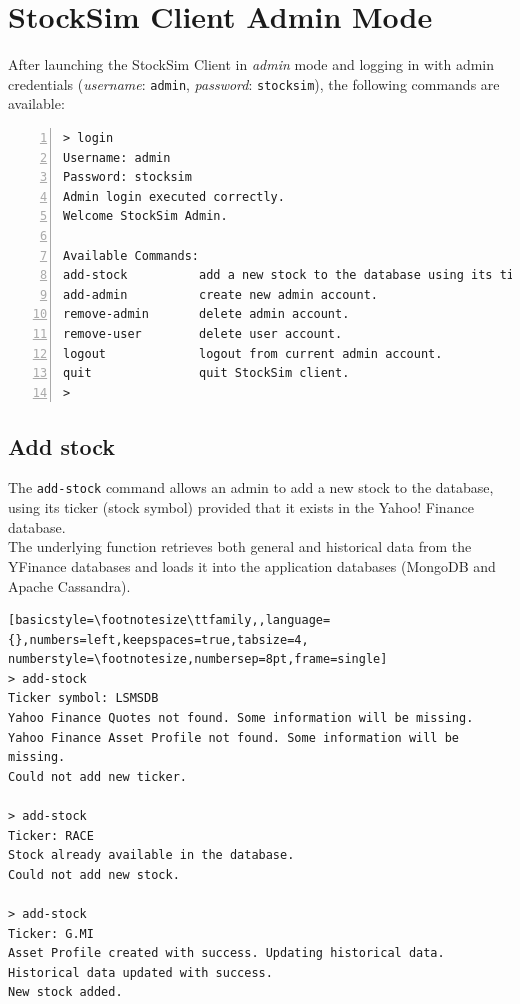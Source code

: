 \section{StockSim Client Admin Mode}
After launching the StockSim Client in \textit{admin} mode and logging in with
admin credentials (\textit{username}: \texttt{admin}, \textit{password}:
\texttt{stocksim}), the following commands are available:
\begin{lstlisting}[basicstyle=\footnotesize\ttfamily,language={},numbers=left,keepspaces=true,tabsize=4,
numberstyle=\footnotesize,numbersep=8pt,frame=single]
> login
Username: admin
Password: stocksim
Admin login executed correctly.
Welcome StockSim Admin.

Available Commands:
add-stock          add a new stock to the database using its ticker.
add-admin          create new admin account.               
remove-admin       delete admin account.                   
remove-user        delete user account.                    
logout             logout from current admin account.      
quit               quit StockSim client.                   
> 
\end{lstlisting}
\vspace{-0.4cm}
\subsection{Add stock}
The \texttt{add-stock} command allows an admin to add a new stock to the
database, using its ticker (stock symbol) provided that it exists in the
Yahoo! Finance database.\\
The underlying function retrieves both general and historical data from the
YFinance databases and loads it into the application databases (MongoDB and
Apache Cassandra).
\begin{lstlisting}[basicstyle=\footnotesize\ttfamily,,language={},numbers=left,keepspaces=true,tabsize=4,
numberstyle=\footnotesize,numbersep=8pt,frame=single]
> add-stock
Ticker symbol: LSMSDB
Yahoo Finance Quotes not found. Some information will be missing.
Yahoo Finance Asset Profile not found. Some information will be missing.
Could not add new ticker.

> add-stock
Ticker: RACE
Stock already available in the database.
Could not add new stock.

> add-stock
Ticker: G.MI
Asset Profile created with success. Updating historical data.
Historical data updated with success.
New stock added.
\end{lstlisting}
\vspace{-0.4cm}
